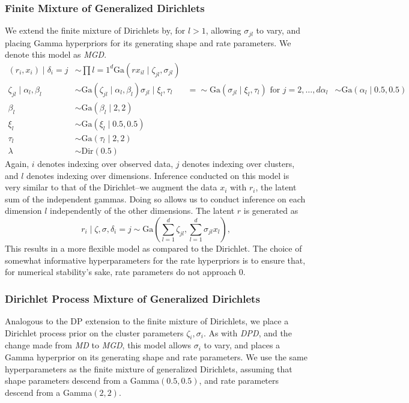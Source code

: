 \subsubsection{Finite Mixture of Generalized Dirichlets}
\label{model:mgd}
We extend the finite mixture of Dirichlets by, for $l > 1$, allowing $\sigma_{jl}$ to vary, and
  placing Gamma hyperpriors for its generating shape and rate parameters.  We denote this model as
  \emph{MGD}.
  \begin{equation}
    \label{eq:fm_gendirichlet}
    \begin{aligned}
    (r_i, x_i) \mid \delta_i=j &\sim \prod{l = 1}^d\text{Ga}(rx_{il}\mid \zeta_{jl}, \sigma_{jl})\\
        \zeta_{jl} \mid \alpha_l,\beta_l &\sim \text{Ga}(\zeta_{jl}\mid \alpha_l, \beta_l)
        \sigma_{jl} \mid \xi_l, \tau_l &=\sim \text{Ga}(\sigma_{jl}\mid \xi_l, \tau_l)
                                                                  \text{ for }j = 2,\ldots,d
        \alpha_l &\sim \text{Ga}(\alpha_l \mid 0.5, 0.5)\\
        \beta_l &\sim \text{Ga}(\beta_l \mid 2, 2)\\
        \xi_l &\sim \text{Ga}(\xi_l\mid 0.5, 0.5)\\
        \tau_l &\sim \text{Ga}(\tau_l\mid 2, 2)\\
        \lambda &\sim \text{Dir}(0.5)
    \end{aligned}
  \end{equation}
Again, $i$ denotes indexing over observed data, $j$ denotes indexing over clusters, and $l$ denotes
  indexing over dimensions.  Inference conducted on this model is very similar to that of the
  Dirichlet--we augment the data $x_i$ with $r_i$, the latent sum of the independent gammas.
  Doing so allows us to conduct inference on each dimension $l$ independently of the other
  dimensions.  The latent $r$ is generated as
  \begin{equation}
    r_i\mid \zeta, \sigma, \delta_i=j \sim
        \text{Ga}\left(\sum_{l = 1}^d\zeta_{jl},\sum_{l=1}^d\sigma_{jl}x_l\right),
  \end{equation}
This results in a more flexible model as compared to the Dirichlet.  The choice of somewhat
  informative hyperparameters for the rate hyperpriors is to ensure that, for numerical stability's
  sake, rate parameters do not approach 0.

\subsubsection{Dirichlet Process Mixture of Generalized Dirichlets}
\label{model:dpgd}
Analogous to the DP extension to the finite mixture of Dirichlets, we place a Dirichlet process
  prior on the cluster parameters $\zeta_i,\sigma_i$.  As with \emph{DPD}, and the change made from
  \emph{MD} to \emph{MGD}, this model allows $\sigma_i$ to vary, and places a Gamma hyperprior on
  its generating shape and rate parameters.  We use the same hyperparameters as the finite mixture
  of generalized Dirichlets, assuming that shape parameters descend from a Gamma$(0.5, 0.5)$, and
  rate parameters descend from a Gamma$(2,2)$.

